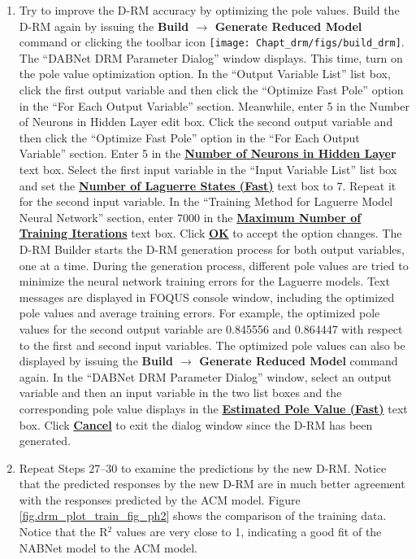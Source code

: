 \begin{enumerate}
	\item Try to improve the D-RM accuracy by optimizing the pole values.  Build the D-RM again by issuing the \textbf{Build $\rightarrow$ Generate Reduced Model} command or clicking the toolbar icon \texttt{[image: Chapt\_drm/figs/build\_drm]}.  The ``DABNet DRM Parameter Dialog'' window displays.  This time, turn on the pole value optimization option.  In the ``Output Variable List'' list box, click the first output variable and then click the ``Optimize Fast Pole'' option in the ``For Each Output Variable'' section.  Meanwhile, enter 5 in the Number of Neurons in Hidden Layer edit box.  Click the second output variable and then click the ``Optimize Fast Pole'' option in the ``For Each Output Variable'' section.  Enter 5 in the \textbf{\underline{Number of Neurons in Hidden Laye}r} text box.  Select the first input variable in the ``Input Variable List'' list box and set the \textbf{\underline{Number of Laguerre States (Fast)}} text box to 7.  Repeat it for the second input variable.  In the ``Training Method for Laguerre Model Neural Network'' section, enter 7000 in the \textbf{\underline{Maximum Number of Training Iterations}} text box.  Click \textbf{\underline{OK}} to accept the option changes.  The D-RM Builder starts the D-RM generation process for both output variables, one at a time.  During the generation process, different pole values are tried to minimize the neural network training errors for the Laguerre models.  Text messages are displayed in FOQUS console window, including the optimized pole values and average training errors.  For example, the optimized pole values for the second output variable are 0.845556 and 0.864447 with respect to the first and second input variables.  The optimized pole values can also be displayed by issuing the \textbf{Build $\rightarrow$ Generate Reduced Model} command again. In the ``DABNet DRM Parameter Dialog'' window, select an output variable and then an input variable in the two list boxes and the corresponding pole value displays in the \textbf{\underline{Estimated Pole Value (Fast)}} text box.  Click \textbf{\underline{Cancel}} to exit the dialog window since the D-RM has been generated.
	\item Repeat Steps 27--30 to examine the predictions by the new D-RM.  Notice that the predicted responses by the new D-RM are in much better agreement with the responses predicted by the ACM model.  Figure \ref{fig.drm_plot_train_fig_ph2} shows the comparison of the training data. Notice that the R$^2$ values are very close to 1, indicating a good fit of the NABNet model to the ACM model. 

\end{enumerate}

